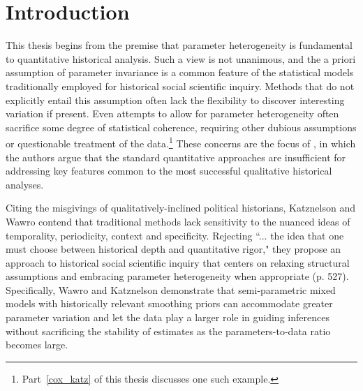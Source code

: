 \chapter{Introduction}
\label{introduction}


This thesis begins from the premise that parameter heterogeneity is fundamental to quantitative 
historical analysis. Such a view is not unanimous, and the a priori assumption of 
parameter invariance is a common feature of the statistical models traditionally employed for 
historical social scientific inquiry. Methods that do not explicitly entail this assumption 
often lack the flexibility to discover interesting variation if present.  Even attempts to allow for parameter 
heterogeneity often sacrifice some degree of statistical coherence, requiring other dubious 
assumptions or questionable treatment of the data.\footnote{Part~\ref{cox_katz} of this thesis 
discusses one such example.} These concerns are the focus of , 
in which the authors argue that the standard quantitative approaches are insufficient for addressing 
key features common to the most successful qualitative historical analyses. 


Citing the misgivings of qualitatively-inclined political historians, Katznelson and Wawro contend 
that traditional methods lack sensitivity to the nuanced ideas of temporality, periodicity, 
context and specificity. Rejecting 
``... the idea that one must choose between historical depth and quantitative rigor," 
they propose an approach to historical social scientific inquiry that centers on relaxing structural 
assumptions and embracing parameter heterogeneity when appropriate (p. 527). Specifically, 
Wawro and Katznelson demonstrate that semi-parametric mixed models with historically relevant 
smoothing priors can accommodate greater parameter variation and let the data play a larger role 
in guiding inferences without sacrificing the stability of estimates as the parameters-to-data ratio 
becomes large.  

